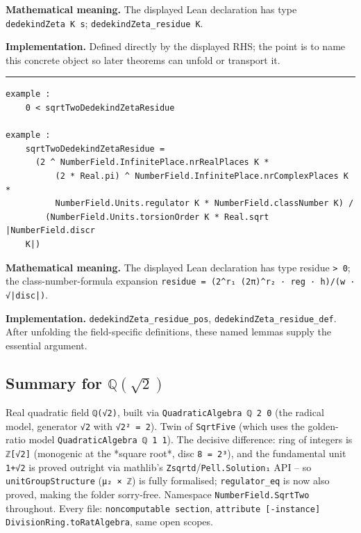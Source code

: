 \documentclass[UTF8,a4paper,11pt,fontset=fandol]{ctexart}
\theoremstyle{definition}
\newcommand{\statementsep}{\par\medskip\hrule\medskip}
\begin{document}
\noindent\textbf{Mathematical meaning.} The displayed Lean declaration has type \texttt{dedekindZeta K s}; \texttt{dedekindZeta\_\allowbreak{}residue K}.\par
\noindent\textbf{Implementation.} Defined directly by the displayed RHS; the point is to name this concrete object so later theorems can unfold or transport it.\par
\statementsep
\begin{verbatim}
example :
    0 < sqrtTwoDedekindZetaResidue

example :
    sqrtTwoDedekindZetaResidue =
      (2 ^ NumberField.InfinitePlace.nrRealPlaces K *
          (2 * Real.pi) ^ NumberField.InfinitePlace.nrComplexPlaces K *
          NumberField.Units.regulator K * NumberField.classNumber K) /
        (NumberField.Units.torsionOrder K * Real.sqrt |NumberField.discr
    K|)
\end{verbatim}
\noindent\textbf{Mathematical meaning.} The displayed Lean declaration has type residue \texttt{> 0}; the class-number-formula expansion \texttt{residue = (2\textasciicircum{}r₁ (2π)\textasciicircum{}r₂ · reg · h)/\allowbreak{}(w · √|disc|)}.\par
\noindent\textbf{Implementation.} \texttt{dedekindZeta\_\allowbreak{}residue\_\allowbreak{}pos}, \texttt{dedekindZeta\_\allowbreak{}residue\_\allowbreak{}def}. After unfolding the field-specific definitions, these named lemmas supply the essential argument.\par


\subsection{Summary for \(\mathbb Q(\sqrt2)\)}

Real quadratic field \texttt{ℚ(√2)}, built via \texttt{QuadraticAlgebra ℚ 2 0} (the radical model, generator \texttt{√2} with \texttt{√2² = 2}). Twin of \texttt{SqrtFive} (which uses the golden-ratio model \texttt{QuadraticAlgebra ℚ 1 1}). The decisive difference: ring of integers is \texttt{ℤ[√2]} (monogenic at the *square root*, disc \texttt{8 = 2³}), and the fundamental unit \texttt{1+√2} is proved outright via mathlib's \texttt{Zsqrtd}/\texttt{Pell.\allowbreak{}Solution₁} API -- so \texttt{unitGroupStructure} (\texttt{μ₂ × ℤ}) is fully formalised; \texttt{regulator\_\allowbreak{}eq} is now also proved, making the folder sorry-free. Namespace \texttt{NumberField.\allowbreak{}SqrtTwo} throughout. Every file: \texttt{noncomputable section}, \texttt{attribute [-instance] DivisionRing.\allowbreak{}toRatAlgebra}, same open scopes.
\end{document}
